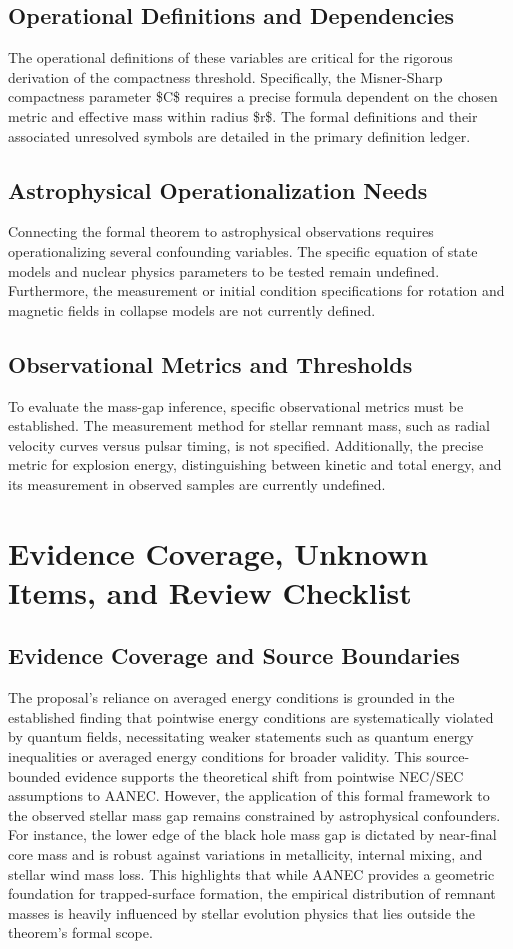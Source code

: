 \documentclass[conference]{IEEEtran}
\begin{document}
\subsection{Operational Definitions and Dependencies}
The operational definitions of these variables are critical for the rigorous derivation of the compactness threshold. Specifically, the Misner-Sharp compactness parameter \$C\$ requires a precise formula dependent on the chosen metric and effective mass within radius \$r\$. The formal definitions and their associated unresolved symbols are detailed in the primary definition ledger.

\subsection{Astrophysical Operationalization Needs}
Connecting the formal theorem to astrophysical observations requires operationalizing several confounding variables. The specific equation of state models and nuclear physics parameters to be tested remain undefined. Furthermore, the measurement or initial condition specifications for rotation and magnetic fields in collapse models are not currently defined.

\subsection{Observational Metrics and Thresholds}
To evaluate the mass-gap inference, specific observational metrics must be established. The measurement method for stellar remnant mass, such as radial velocity curves versus pulsar timing, is not specified. Additionally, the precise metric for explosion energy, distinguishing between kinetic and total energy, and its measurement in observed samples are currently undefined.

\section{Evidence Coverage, Unknown Items, and Review Checklist}
\subsection{Evidence Coverage and Source Boundaries}
The proposal's reliance on averaged energy conditions is grounded in the established finding that pointwise energy conditions are systematically violated by quantum fields, necessitating weaker statements such as quantum energy inequalities or averaged energy conditions for broader validity. This source-bounded evidence supports the theoretical shift from pointwise NEC/SEC assumptions to AANEC. However, the application of this formal framework to the observed stellar mass gap remains constrained by astrophysical confounders. For instance, the lower edge of the black hole mass gap is dictated by near-final core mass and is robust against variations in metallicity, internal mixing, and stellar wind mass loss. This highlights that while AANEC provides a geometric foundation for trapped-surface formation, the empirical distribution of remnant masses is heavily influenced by stellar evolution physics that lies outside the theorem's formal scope.~\cite{cite_0ed84243cf171bc4,cite_7a407c865faafd11}
\end{document}
